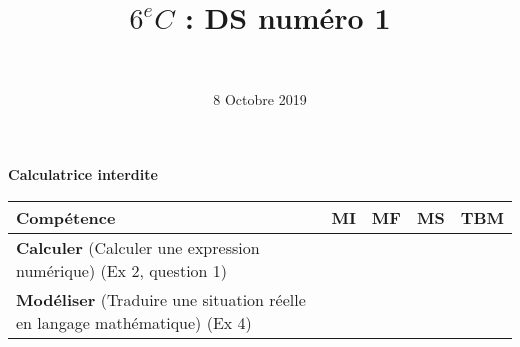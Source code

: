 \documentclass[a4paper,11pt]{exam}
\author{\ }
\date{8 Octobre 2019}
\title{$6^e C$ : DS num\'ero 1}
\begin{document}
%	

	\maketitle
	
\begin{center}
	\textbf{Calculatrice interdite}
\end{center}

\begin{small}
	\begin{center}
		\begin{tabular}{|@{\ }l@{\ }|@{\ }c@{\ }|@{\ }c@{\ }|@{\ }c@{\ }|@{\ }c@{\ }|}
			\hline
			\textbf{Compétence} & \textbf{MI} & \textbf{MF} & \textbf{MS} & \textbf{TBM} \\
			\hline
			\textbf{Calculer} (Calculer une expression numérique) (Ex 2, question 1)&  \ \ & \ \ & \ \ & \ \  \\
			\hline	
			\textbf{Modéliser} (Traduire une situation réelle en langage mathématique) (Ex 4)& \ \ & \ \ &  \ \  & \ \ \\
			\hline
		\end{tabular}
	\end{center}
\end{small}	

	
	
	












\label{LastPage}

%
\end{document}
